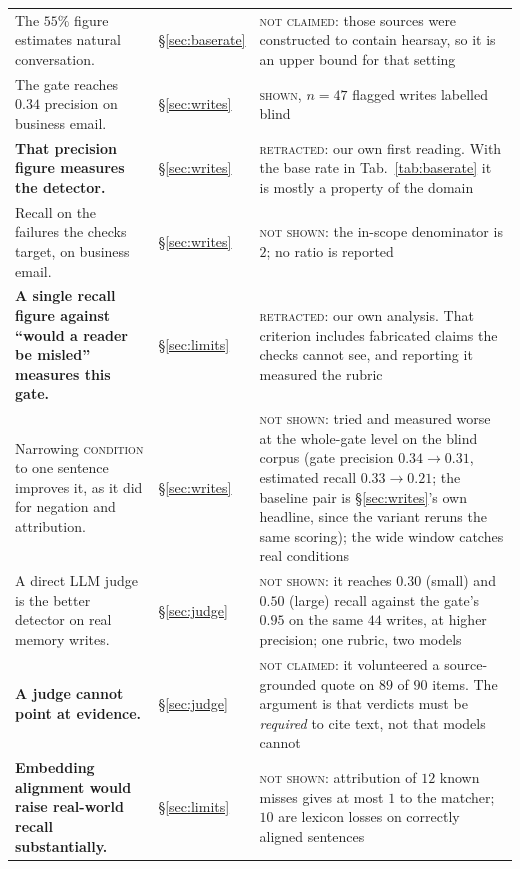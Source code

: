 \documentclass[11pt]{article}
\begin{document}
{\begin{longtable}{@{}L{0.46\textwidth} L{0.18\textwidth} L{0.28\textwidth}@{}}
The $55\%$ figure estimates natural conversation. & \S\ref{sec:baserate} &
\textsc{not claimed}: those sources were constructed to contain hearsay, so it is an
upper bound for that setting \\

The gate reaches $0.34$ precision on business email. & \S\ref{sec:writes} &
\textsc{shown}, $n=47$ flagged writes labelled blind \\

\textbf{That precision figure measures the detector.} & \S\ref{sec:writes} &
\textsc{retracted}: our own first reading. With the base rate in
Tab.~\ref{tab:baserate} it is mostly a property of the domain \\

Recall on the failures the checks target, on business email. & \S\ref{sec:writes} &
\textsc{not shown}: the in-scope denominator is $2$; no ratio is reported \\

\textbf{A single recall figure against ``would a reader be misled'' measures this gate.} &
\S\ref{sec:limits} & \textsc{retracted}: our own analysis. That criterion includes
fabricated claims the checks cannot see, and reporting it measured the rubric \\

Narrowing \textsc{condition} to one sentence improves it, as it did for negation and
attribution. & \S\ref{sec:writes} & \textsc{not shown}: tried and measured worse at the
whole-gate level on the blind corpus (gate precision $0.34\to0.31$, estimated recall
$0.33\to0.21$; the baseline pair is \S\ref{sec:writes}'s own headline, since the variant
reruns the same scoring); the wide window catches real conditions \\

A direct LLM judge is the better detector on real memory writes. &
\S\ref{sec:judge} & \textsc{not shown}: it reaches $0.30$ (small) and $0.50$ (large)
recall against the gate's $0.95$ on the same $44$ writes, at higher precision; one
rubric, two models \\

\textbf{A judge cannot point at evidence.} & \S\ref{sec:judge} &
\textsc{not claimed}: it volunteered a source-grounded quote on $89$ of $90$ items. The
argument is that verdicts must be \emph{required} to cite text, not that models cannot \\

\textbf{Embedding alignment would raise real-world recall substantially.} &
\S\ref{sec:limits} & \textsc{not shown}: attribution of $12$ known misses gives at most
$1$ to the matcher; $10$ are lexicon losses on correctly aligned sentences \\


\end{longtable}}
\end{document}

